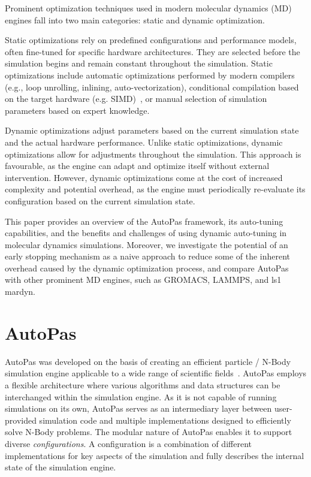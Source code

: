 \documentclass[conference]{IEEEtran}
\begin{document}
Prominent optimization techniques used in modern molecular dynamics (MD) engines fall into two main categories: static and dynamic optimization.

Static optimizations rely on predefined configurations and performance models, often fine-tuned for specific hardware architectures. They are selected before the simulation begins and remain constant throughout the simulation. Static optimizations include automatic optimizations performed by modern compilers (e.g., loop unrolling, inlining, auto-vectorization), conditional compilation based on the target hardware (e.g. SIMD)~\cite{Gratl2019AutoPas}, or manual selection of simulation parameters based on expert knowledge.

Dynamic optimizations adjust parameters based on the current simulation state and the actual hardware performance. Unlike static optimizations, dynamic optimizations allow for adjustments throughout the simulation. This approach is favourable, as the engine can adapt and optimize itself without external intervention. However, dynamic optimizations come at the cost of increased complexity and potential overhead, as the engine must periodically re-evaluate its configuration based on the current simulation state.

This paper provides an overview of the AutoPas framework, its auto-tuning capabilities, and the benefits and challenges of using dynamic auto-tuning in molecular dynamics simulations. Moreover, we investigate the potential of an early stopping mechanism as a naive approach to reduce some of the inherent overhead caused by the dynamic optimization process, and compare AutoPas with other prominent MD engines, such as GROMACS, LAMMPS, and ls1 mardyn.


\section{AutoPas}

AutoPas was developed on the basis of creating an efficient particle / N-Body simulation engine applicable to a wide range of scientific fields~\cite{Tchipev2020}. AutoPas employs a flexible architecture where various algorithms and data structures can be interchanged within the simulation engine. As it is not capable of running simulations on its own, AutoPas serves as an intermediary layer between user-provided simulation code and multiple implementations designed to efficiently solve N-Body problems. The modular nature of AutoPas enables it to support diverse \textit{configurations}. A configuration is a combination of different implementations for key aspects of the simulation and fully describes the internal state of the simulation engine.
\end{document}
